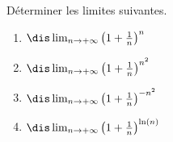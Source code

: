 \documentclass[a4paper,10pt]{report}
\begin{document}
\begin{Exa} Déterminer les limites suivantes. 

\begin{multicols}{2}
\begin{enumerate}
\item $\dis \lim_{n \rightarrow + \infty} \left(1+ \frac{1}{n}\right)^n$
\item $\dis \lim_{n \rightarrow + \infty} \left(1+ \frac{1}{n}\right)^{n^2}$
\columnbreak
\item $\dis \lim_{n \rightarrow + \infty} \left(1+ \frac{1}{n}\right)^{-n^2}$
\item $\dis \lim_{n \rightarrow + \infty} \left(1+ \frac{1}{n}\right)^{\ln(n)}$
\end{enumerate}
\end{multicols}
\vspace{0.1cm}
\end{Exa} 

\corr 
\end{document}
